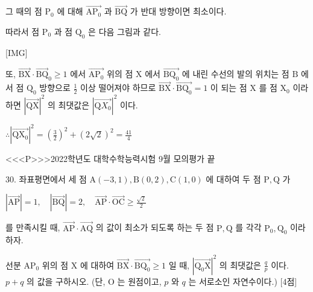 \documentclass{oblivoir}
\begin{document}
그 때의 점 $\mathrm{P}_{0}$ 에 대해 $\overrightarrow{\mathrm{AP}_{0}}$ 과 $\overrightarrow{\mathrm{BQ}}$ 가 반대 방향이면 최소이다.

따라서 점 $\mathrm{P}_{0}$ 과 점 $\mathrm{Q}_{0}$ 은 다음 그림과 같다.

[IMG]

또, $\overrightarrow{\mathrm{BX}} \cdot \overrightarrow{\mathrm{BQ}}_{0} \geq 1$ 에서 $\overrightarrow{\mathrm{AP}_{0}}$ 위의 점 $\mathrm{X}$ 에서 $\overrightarrow{\mathrm{BQ}_{0}}$ 에 내린 수선의 발의 위치는 점 $\mathrm{B}$ 에서 점 $\mathrm{Q}_{0}$ 방향으로 $\frac{1}{2}$ 이상 떨어져야 하므로
$\overrightarrow{\mathrm{BX}} \cdot \overrightarrow{\mathrm{BQ}_{0}}=1$ 이 되는 점 $\mathrm{X}$ 를 점 $\mathrm{X}_{0}$ 이라 하면 $|\overrightarrow{\mathrm{QX}}|^{2}$ 의 최댓값은 $\left|\overrightarrow{\mathrm{Q} X_{0}}\right|^{2}$ 이다.

$\therefore\left|\overrightarrow{\mathrm{Q} \mathrm{X}_{0}}\right|^{2}=\left(\frac{3}{2}\right)^{2}+(2 \sqrt{2})^{2}=\frac{41}{4}$


<<<P>>>2022학년도 대학수학능력시험 9월 모의평가 끝

30. 좌표평면에서 세 점 $\mathrm{A}(-3,1), \mathrm{B}(0,2), \mathrm{C}(1,0)$ 에 대하여 두 점 $\mathrm{P}, \mathrm{Q}$ 가

$|\overrightarrow{\mathrm{AP}}|=1, \quad|\overrightarrow{\mathrm{BQ}}|=2, \quad \overrightarrow{\mathrm{AP}} \cdot \overrightarrow{\mathrm{OC}} \geq \frac{\sqrt{2}}{2}$

를 만족시킬 때, $\overrightarrow{\mathrm{AP}} \cdot \overrightarrow{\mathrm{AQ}}$ 의 값이 최소가 되도록 하는 두 점 $\mathrm{P}, \mathrm{Q}$ 를 각각 $\mathrm{P}_{0}, \mathrm{Q}_{0}$ 이라 하자.

선분 $\mathrm{AP}_{0}$ 위의 점 $\mathrm{X}$ 에 대하여 $\overrightarrow{\mathrm{BX}} \cdot \overrightarrow{\mathrm{BQ}_{0}} \geq 1$ 일 때, $\left|\overrightarrow{\mathrm{Q}_{0} \mathrm{X}}\right|^{2}$ 의 최댓값은 $\frac{q}{p}$ 이다. $p+q$ 의 값을 구하시오. (단, $\mathrm{O}$ 는 원점이고, $p$ 와 $q$ 는 서로소인 자연수이다.) [4점]
\end{document}

